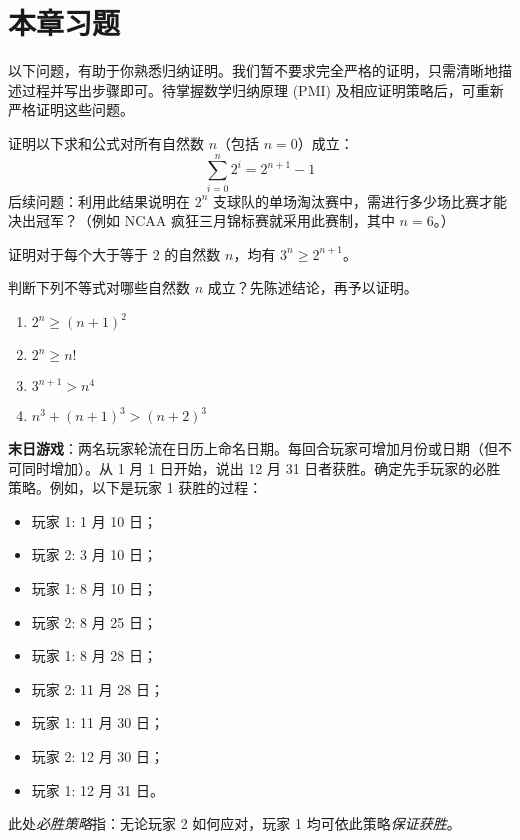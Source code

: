 \section{本章习题}

以下问题，有助于你熟悉归纳证明。我们暂不要求完全严格的证明，只需清晰地描述过程并写出步骤即可。待掌握数学归纳原理 (PMI) 及相应证明策略后，可重新严格证明这些问题。

\begin{exercise} \label{exc:exercises2.7.1}
    证明以下求和公式对所有自然数 $n$（包括 $n=0$）成立：
    \[\sum_{i=0}^{n}2^i=2^{n+1}-1\]
    后续问题：利用此结果说明在 $2^n$ 支球队的单场淘汰赛中，需进行多少场比赛才能决出冠军？（例如 NCAA 疯狂三月锦标赛就采用此赛制，其中 $n=6$。）
\end{exercise}

\begin{exercise}
    证明对于每个大于等于 $2$ 的自然数 $n$，均有 $3^n \ge 2^{n+1}$。
\end{exercise}

\begin{exercise}
    判断下列不等式对哪些自然数 $n$ 成立？先陈述结论，再予以证明。
    \begin{enumerate}
        \item $2^n \ge (n + 1)^2$
        \item $2^n \ge n!$
        \item $3^{n+1} > n^4$
        \item $n^3 + (n + 1)^3 > (n + 2)^3$
    \end{enumerate}
\end{exercise}

\begin{exercise}
    \textbf{末日游戏}：两名玩家轮流在日历上命名日期。每回合玩家可增加月份或日期（但不可同时增加）。从 1 月 1 日开始，说出 12 月 31 日者获胜。确定先手玩家的必胜策略。例如，以下是玩家 1 获胜的过程：
    \begin{itemize}
        \item 玩家 1: 1 月 10 日；
        \item 玩家 2: 3 月 10 日；
        \item 玩家 1: 8 月 10 日；
        \item 玩家 2: 8 月 25 日；
        \item 玩家 1: 8 月 28 日；
        \item 玩家 2: 11 月 28 日；
        \item 玩家 1: 11 月 30 日；
        \item 玩家 2: 12 月 30 日；
        \item 玩家 1: 12 月 31 日。
    \end{itemize}
    此处\emph{必胜策略}指：无论玩家 2 如何应对，玩家 1 均可依此策略\emph{保证获胜}。
\end{exercise}

